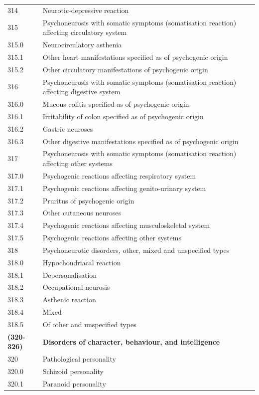 \begin{longtable}[!t]{ | p{2cm} | p{11.8cm} | }
314&Neurotic-depressive reaction\\
315&Psychoneurosis with somatic symptoms (somatisation reaction) affecting circulatory system\\
315.0&     Neurocirculatory asthenia\\
315.1&     Other heart manifestations specified as of psychogenic origin\\
315.2&     Other circulatory manifestations of psychogenic origin\\
316&Psychoneurosis with somatic symptoms (somatisation reaction) affecting digestive system\\
316.0&     Mucous colitis specified as of psychogenic origin\\
316.1&     Irritability of colon specified as of psychogenic origin\\
316.2&     Gastric neuroses\\
316.3&     Other digestive manifestations specified as of psychogenic origin\\
317&Psychoneurosis with somatic symptoms (somatisation reaction) affecting other systems\\
317.0&     Psychogenic reactions affecting respiratory system\\
317.1&     Psychogenic reactions affecting genito-urinary system\\
317.2&     Pruritus of psychogenic origin\\
317.3&     Other cutaneous neuroses\\
317.4&     Psychogenic reactions affecting musculoskeletal system\\
317.5&     Psychogenic reactions affecting other systems\\
318&Psychoneurotic disorders, other, mixed and unspecified types\\
318.0&     Hypochondriacal reaction\\
318.1&     Depersonalisation\\
318.2&     Occupational neurosis\\
318.3&     Asthenic reaction\\
318.4&     Mixed\\
318.5&     Of other and unspecified types\\ \hline
\textbf{(320-326)}&\textbf{Disorders of character, behaviour, and intelligence}\\ \hline
320&Pathological personality\\
320.0&     Schizoid personality\\
320.1&     Paranoid personality\\

\end{longtable}
